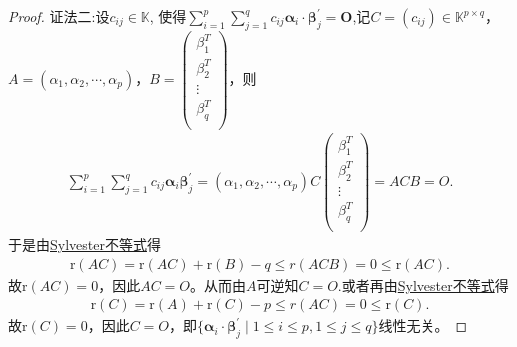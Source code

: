 \documentclass[../../main.tex]{subfiles}
\begin{document}
\begin{proof}
{\color{blue}证法二:}设\(c_{ij}\in\mathbb{K}\), 使得\(\sum_{i = 1}^{p}\sum_{j = 1}^{q}c_{ij}\boldsymbol{\alpha}_{i}\cdot\boldsymbol{\beta}_{j}^{\prime}=\boldsymbol{O}\),记$C=( c_{ij} ) \in \mathbb{K} ^{p\times q}$，$A=( \alpha _1,\alpha _2,\cdots ,\alpha _p )$，$B=\begin{pmatrix}
\beta _{1}^{T}\\
\beta _{2}^{T}\\
\vdots\\
\beta _{q}^{T}\\
\end{pmatrix}$，则
\begin{align*}
\sum_{i=1}^p{\sum_{j=1}^q{c_{ij}\boldsymbol{\alpha }_i}}\boldsymbol{\beta }_{j}^{\prime}=(\alpha _1,\alpha _2,\cdots ,\alpha _p ) C\begin{pmatrix}
\beta _{1}^{T}\\
\beta _{2}^{T}\\
\vdots\\
\beta _{q}^{T}\\
\end{pmatrix}=ACB=O.
\end{align*}
于是由\hyperref[proposition:Sylvester(西尔维斯特)不等式]{Sylvester不等式}得
\begin{align*}
\mathrm{r}( AC ) =\mathrm{r}( AC ) +\mathrm{r}( B ) -q\leqslant r( ACB ) =0\leqslant \mathrm{r}( AC ).
\end{align*}
故$\mathrm{r}( AC )=0$，因此$AC=O$。从而由$A$可逆知$C=O$.或者再由\hyperref[proposition:Sylvester(西尔维斯特)不等式]{Sylvester不等式}得
\begin{align*}
\mathrm{r}( C ) =\mathrm{r}( A ) +\mathrm{r}( C ) -p\leqslant r( AC ) =0\leqslant \mathrm{r}( C ).
\end{align*}
故$\mathrm{r}( C )=0$，因此$C=O$，即$\{\boldsymbol{\alpha }_i\cdot \boldsymbol{\beta }_{j}^{\prime}\mid 1\le i\le p,1\le j\le q\}$线性无关。
\end{proof}
\end{document}
